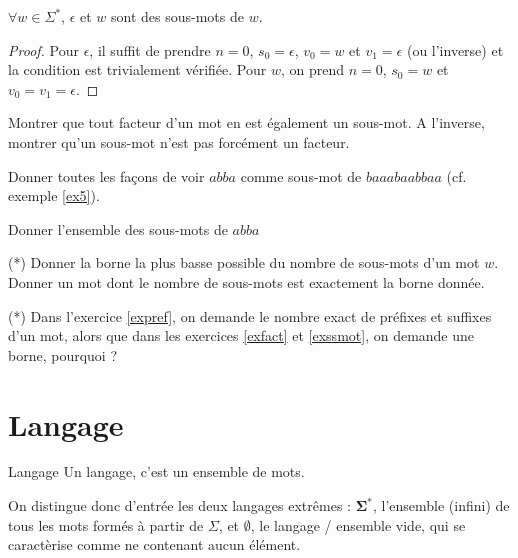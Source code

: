 \begin{lemma}
$\forall w \in \Sigma^*$, $\epsilon$ et $w$ sont des sous-mots de $w$.
\end{lemma}

\begin{proof}
Pour $\epsilon$, il suffit de prendre $n = 0$, $s_0 = \epsilon$, $v_0 = w$ et $v_1 = \epsilon$ (ou l'inverse) et la condition est trivialement vérifiée. Pour $w$, on prend $n = 0$, $s_0 = w$ et $v_0 = v_1 = \epsilon$.
\end{proof}

\begin{exercice}
Montrer que tout facteur d'un mot en est également un sous-mot. A l'inverse, montrer qu'un sous-mot n'est pas forcément un facteur. 
\end{exercice}

\begin{exercice}
Donner toutes les façons de voir $abba$ comme sous-mot de $baaabaabbaa$ (cf. exemple \ref{ex5}).
\end{exercice}

\begin{exercice}
Donner l'ensemble des sous-mots de $abba$
\end{exercice}

\begin{exercice}\label{exssmot} (*)
Donner la borne la plus basse possible du nombre de sous-mots d'un mot $w$. Donner un mot dont le nombre de sous-mots est exactement la borne donnée.
\end{exercice}

\begin{exercice} (*) Dans l'exercice \ref{expref}, on demande le nombre exact de préfixes et suffixes d'un mot, alors que dans les exercices \ref{exfact} et \ref{exssmot}, on demande une borne, pourquoi ?
\end{exercice}

\section{Langage}

\begin{definition}{Langage}{}
Un langage, c'est un ensemble de mots. 
\end{definition}

On distingue donc d'entrée les deux langages extrêmes : $\mathbf{\Sigma^*}$, l'ensemble (infini) de tous les mots formés à partir de $\Sigma$, et $\mathbf{\emptyset}$, le langage / ensemble vide, qui se caractèrise comme ne contenant aucun élément.

